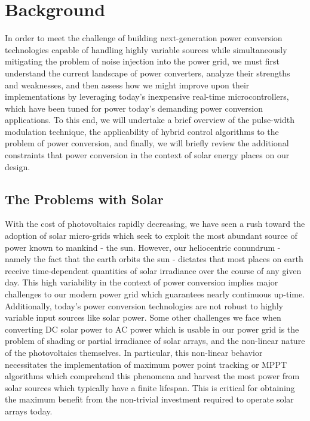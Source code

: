 \section{Background}
In order to meet the challenge of building next-generation power conversion technologies capable of handling highly variable sources while simultaneously mitigating the problem of noise injection into the power grid, we must first understand the current landscape of power converters, analyze their strengths and weaknesses, and then assess how we might improve upon their implementations by leveraging today's inexpensive real-time microcontrollers, which have been tuned for power today's demanding power conversion applications. To this end, we will undertake a brief overview of the pulse-width modulation technique, the applicability of hybrid control algorithms to the problem of power conversion, and finally, we will briefly review the additional constraints that power conversion in the context of solar energy places on our design. 

\subsection{The Problems with Solar}
With the cost of photovoltaics rapidly decreasing, we have seen a rush toward the adoption of solar micro-grids which seek to exploit the most abundant source of power known to mankind - the sun. However, our heliocentric conundrum - namely the fact that the earth orbits the sun - dictates that most places on earth receive time-dependent quantities of solar irradiance over the course of any given day. This high variability in the context of power conversion implies major challenges to our modern power grid which guarantees nearly continuous up-time. Additionally, today's power conversion technologies are not robust to highly variable input sources like solar power. Some other challenges we face when converting DC solar power to AC power which is usable in our power grid is the problem of shading or partial irradiance of solar arrays, and the non-linear nature of the photovoltaics themselves. In particular, this non-linear behavior necessitates the implementation of maximum power point tracking or MPPT algorithms which comprehend this phenomena and harvest the most power from solar sources which typically have a finite lifespan. This is critical for obtaining the maximum benefit from the non-trivial investment required to operate solar arrays today. 


